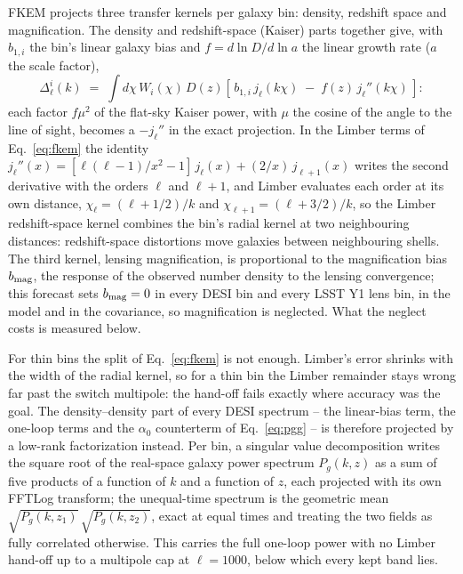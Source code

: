 \documentclass[11pt]{article}
\begin{document}
FKEM projects three transfer kernels per galaxy bin: density,
redshift space and magnification.  The density and redshift-space
(Kaiser) parts together give, with $b_{1,i}$ the bin's linear galaxy
bias and $f = d\ln D/d\ln a$ the linear growth rate ($a$ the scale
factor),
\begin{equation}
  \Delta_\ell^i(k) \;=\; \int d\chi\, W_i(\chi)\, D(z)
  \left[\, b_{1,i}\, j_\ell(k\chi) \;-\; f(z)\, j_\ell''(k\chi)
  \,\right] :
  \label{eq:kaiserkernel}
\end{equation}
each factor $f\mu^2$ of the flat-sky Kaiser power, with $\mu$ the
cosine of the angle to the line of sight, becomes a $-j_\ell''$ in the
exact projection.  In the Limber terms of Eq.~\eqref{eq:fkem} the
identity $j_\ell''(x) = [\ell(\ell-1)/x^2 - 1]\,j_\ell(x)
+ (2/x)\,j_{\ell+1}(x)$ writes the second derivative with the orders
$\ell$ and $\ell+1$, and Limber evaluates each order at its own
distance, $\chi_\ell = (\ell + 1/2)/k$ and
$\chi_{\ell+1} = (\ell + 3/2)/k$, so the Limber redshift-space kernel
combines the bin's radial kernel at two neighbouring distances:
redshift-space distortions move galaxies between neighbouring shells.
The third kernel, lensing magnification, is proportional to
the magnification bias $b_{\rm mag}$, the response of the observed
number density to the lensing convergence; this forecast sets
$b_{\rm mag} = 0$ in every DESI bin and every LSST Y1 lens bin, in
the model and in the covariance, so magnification is neglected.
What the neglect costs is measured below.

For thin bins the split of Eq.~\eqref{eq:fkem} is not enough.
Limber's error shrinks with the width of the radial kernel, so for a
thin bin the Limber remainder stays wrong far past the switch
multipole: the hand-off fails exactly where accuracy was the goal.
The density--density part of every DESI spectrum -- the linear-bias
term, the one-loop terms and the $\alpha_0$ counterterm of
Eq.~\eqref{eq:pgg} -- is therefore projected by a low-rank
factorization instead.  Per bin, a singular value decomposition writes
the square root of the real-space galaxy power spectrum $P_g(k, z)$ as
a sum of five products of a function of $k$ and a function of $z$,
each projected with its own FFTLog transform; the unequal-time
spectrum is the geometric mean
$\sqrt{P_g(k, z_1)}\,\sqrt{P_g(k, z_2)}$, exact at equal times and
treating the two fields as fully correlated otherwise.  This carries
the full one-loop power with no Limber hand-off up to a multipole cap
at $\ell = 1000$, below which every kept band lies.
\end{document}
